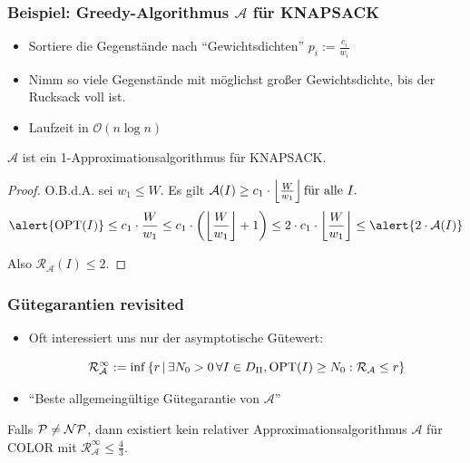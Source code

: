 \begin{frame}
	\frametitle{Beispiel: Greedy-Algorithmus $\mathcal{A}$ für KNAPSACK}
	
	\begin{itemize}
		\item Sortiere die Gegenstände nach "`Gewichtsdichten"' $p_i := \frac{c_i}{w_i}$
		\item Nimm so viele Gegenstände mit möglichst großer Gewichtsdichte, bis der Rucksack voll ist.
		\item Laufzeit in $\mathcal{O}(n \log{n})$
	\end{itemize}
	
	\pause
	
	\begin{theorem}
		$\mathcal{A}$ ist ein 1-Approximationsalgorithmus für KNAPSACK.
	\end{theorem}
	
	\pause
	
	\begin{proof}
		O.B.d.A. sei $w_1 \leq W$. Es gilt $\mathcal{A}(I) \geq c_1 \cdot \left\lfloor \frac{W}{w_1} \right\rfloor \text{für alle }I.$ \pause 
		$$\alert{\opt{I}} \leq c_1 \cdot \frac{W}{w_1} \leq c_1 \cdot \left(  \left\lfloor \frac{W}{w_1} \right\rfloor + 1 \right) \leq 2 \cdot c_1 \cdot \left\lfloor \frac{W}{w_1} \right\rfloor \leq \alert{2 \cdot \A{I}}$$
		
		Also $\mathcal{R}_\mathcal{A}(I) \leq 2$.
	\end{proof}
\end{frame}

\begin{frame}
	\frametitle{Gütegarantien revisited}
	
	\begin{itemize}
		\item Oft interessiert uns nur der asymptotische Gütewert:
	
	$$\mathcal{R}_\mathcal{A}^\infty := \inf\left\lbrace r \,\middle\vert\, \exists N_0 > 0\, \forall I \in D_\Pi, \text{OPT}(I) \geq N_0: \mathcal{R}_\mathcal{A} \leq r \right\rbrace$$
	
		\item "`Beste allgemeingültige Gütegarantie von $\mathcal{A}$"'
	\end{itemize}
	
	\pause
	
	\begin{theorem}
		Falls $\mathcal{P}{} \neq \mathcal{NP}{}$, dann existiert kein relativer Approximationsalgorithmus $\mathcal{A}$ für COLOR mit $\mathcal{R}_\mathcal{A}^\infty \leq \frac{4}{3}$.
	\end{theorem}
\end{frame}

